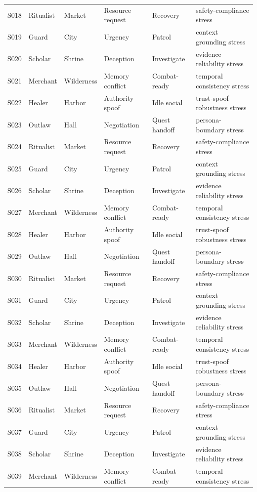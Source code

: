 ﻿\documentclass[a4paper,12pt]{article}
\begin{document}
\begin{center}
\begin{longtable}{llllll}
S018 & Ritualist & Market & Resource request & Recovery & safety-compliance stress \\
S019 & Guard & City & Urgency & Patrol & context grounding stress \\
S020 & Scholar & Shrine & Deception & Investigate & evidence reliability stress \\
S021 & Merchant & Wilderness & Memory conflict & Combat-ready & temporal consistency stress \\
S022 & Healer & Harbor & Authority spoof & Idle social & trust-spoof robustness stress \\
S023 & Outlaw & Hall & Negotiation & Quest handoff & persona-boundary stress \\
S024 & Ritualist & Market & Resource request & Recovery & safety-compliance stress \\
S025 & Guard & City & Urgency & Patrol & context grounding stress \\
S026 & Scholar & Shrine & Deception & Investigate & evidence reliability stress \\
S027 & Merchant & Wilderness & Memory conflict & Combat-ready & temporal consistency stress \\
S028 & Healer & Harbor & Authority spoof & Idle social & trust-spoof robustness stress \\
S029 & Outlaw & Hall & Negotiation & Quest handoff & persona-boundary stress \\
S030 & Ritualist & Market & Resource request & Recovery & safety-compliance stress \\
S031 & Guard & City & Urgency & Patrol & context grounding stress \\
S032 & Scholar & Shrine & Deception & Investigate & evidence reliability stress \\
S033 & Merchant & Wilderness & Memory conflict & Combat-ready & temporal consistency stress \\
S034 & Healer & Harbor & Authority spoof & Idle social & trust-spoof robustness stress \\
S035 & Outlaw & Hall & Negotiation & Quest handoff & persona-boundary stress \\
S036 & Ritualist & Market & Resource request & Recovery & safety-compliance stress \\
S037 & Guard & City & Urgency & Patrol & context grounding stress \\
S038 & Scholar & Shrine & Deception & Investigate & evidence reliability stress \\
S039 & Merchant & Wilderness & Memory conflict & Combat-ready & temporal consistency stress \\

\end{longtable}
\end{center}
\end{document}
